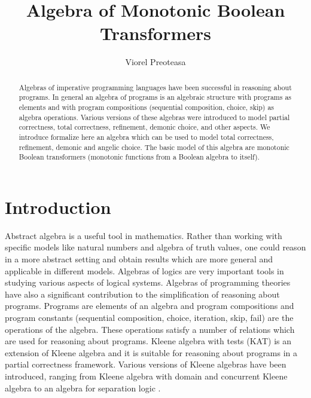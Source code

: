 \documentclass[11pt,a4paper]{article}
\begin{document}
\title{Algebra of Monotonic Boolean Transformers}
\author{Viorel Preoteasa}
\maketitle
\begin{abstract}
Algebras of imperative programming languages have 
been successful in reasoning about programs. In general an 
algebra of programs is an algebraic structure with programs 
as elements and with program compositions (sequential composition, 
choice, skip) as algebra operations. Various versions of these 
algebras were introduced to model partial correctness, total 
correctness, refinement, demonic choice, and other aspects. 
We introduce formalize here an algebra which can be used to model total 
correctness, refinement, demonic and angelic choice. The basic 
model of this algebra are monotonic Boolean transformers (monotonic 
functions from a Boolean algebra to itself).
\end{abstract}

\tableofcontents

\section{Introduction}

Abstract algebra is a useful tool in mathematics. Rather than working with 
specific models like natural numbers and algebra of truth values, one could 
reason in a more abstract setting and obtain results which are more general 
and applicable in different models. Algebras of logics are very important 
tools in studying various aspects of logical systems. Algebras of programming 
theories have also a significant contribution to the simplification of 
reasoning about programs. Programs are elements of an algebra and program 
compositions and program constants (sequential composition, choice, iteration, 
skip, fail) are the operations of the algebra. These operations satisfy a number 
of relations which are used for reasoning about programs. Kleene algebra with 
tests (KAT) \cite{kozen:1997} is an extension of Kleene algebra and it is suitable 
for reasoning about programs in a partial correctness framework. Various 
versions of Kleene algebras have been introduced, ranging from Kleene algebra 
with domain \cite{desharnais:moller:struth:2006} and concurrent Kleene algebra 
\cite{hoare:moller:struth:wehrman:2009} to an algebra for separation logic 
\cite{dang:hofner:moller:2011}. 
\end{document}
